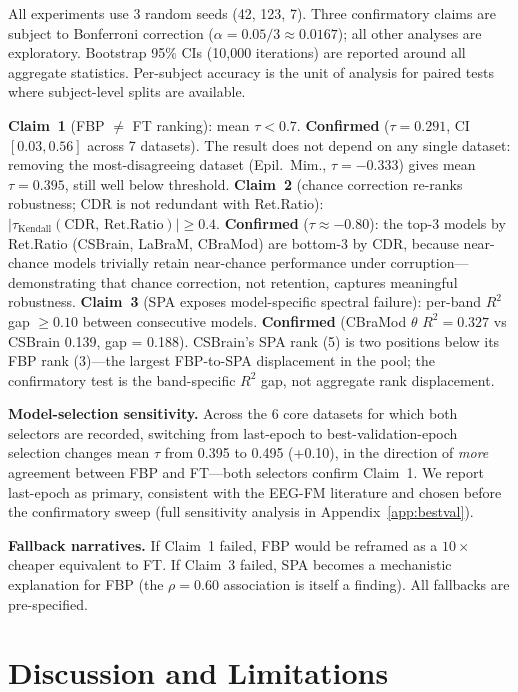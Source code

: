 \documentclass{article}
\begin{document}
All experiments use 3 random seeds (42, 123, 7). Three confirmatory claims are subject to Bonferroni correction ($\alpha = 0.05/3 \approx 0.0167$); all other analyses are exploratory. Bootstrap 95\% CIs (10,000 iterations) are reported around all aggregate statistics. Per-subject accuracy is the unit of analysis for paired tests where subject-level splits are available.

\textbf{Claim~1} (FBP $\neq$ FT ranking): mean $\tau < 0.7$. \textbf{Confirmed} ($\tau = 0.291$, CI $[0.03, 0.56]$ across 7 datasets). The result does not depend on any single dataset: removing the most-disagreeing dataset (Epil.\ Mim., $\tau = -0.333$) gives mean $\tau = 0.395$, still well below threshold. \textbf{Claim~2} (chance correction re-ranks robustness; CDR is not redundant with Ret.Ratio): $|\tau_{\text{Kendall}}(\text{CDR},\, \text{Ret.Ratio})| \geq 0.4$. \textbf{Confirmed} ($\tau \approx -0.80$): the top-3 models by Ret.Ratio (CSBrain, LaBraM, CBraMod) are bottom-3 by CDR, because near-chance models trivially retain near-chance performance under corruption---demonstrating that chance correction, not retention, captures meaningful robustness. \textbf{Claim~3} (SPA exposes model-specific spectral failure): per-band $R^2$ gap $\geq 0.10$ between consecutive models. \textbf{Confirmed} (CBraMod $\theta$ $R^2 = 0.327$ vs CSBrain 0.139, gap = 0.188). CSBrain's SPA rank (5) is two positions below its FBP rank (3)---the largest FBP-to-SPA displacement in the pool; the confirmatory test is the band-specific $R^2$ gap, not aggregate rank displacement.

\textbf{Model-selection sensitivity.} Across the 6 core datasets for which both selectors are recorded, switching from last-epoch to best-validation-epoch selection changes mean $\tau$ from 0.395 to 0.495 (+0.10), in the direction of \emph{more} agreement between FBP and FT---both selectors confirm Claim~1. We report last-epoch as primary, consistent with the EEG-FM literature and chosen before the confirmatory sweep (full sensitivity analysis in Appendix~\ref{app:bestval}).

\textbf{Fallback narratives.} If Claim~1 failed, FBP would be reframed as a $10\times$ cheaper equivalent to FT. If Claim~3 failed, SPA becomes a mechanistic explanation for FBP (the $\rho = 0.60$ association is itself a finding). All fallbacks are pre-specified.

\section{Discussion and Limitations}
\label{sec:discussion}
\end{document}
